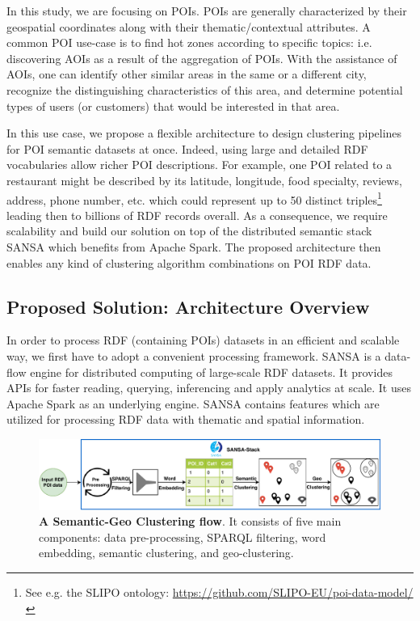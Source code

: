 In this study, we are focusing on \gls{POI}s.
\gls{POI}s are generally characterized by their geospatial coordinates along with their thematic/contextual attributes.
A common \gls{POI} use-case is to find hot zones according to specific topics: i.e. discovering \gls{AOI}s as a result of the aggregation of \gls{POI}s.
With the assistance of \gls{AOI}s, one can identify other similar areas in the same or a different city, recognize the distinguishing characteristics of this area, and determine potential types of users (or customers) that would be interested in that area.

In this use case, we propose a flexible architecture to design clustering pipelines for \gls{POI} semantic datasets at once.
Indeed, using large and detailed \gls{RDF} vocabularies allow richer \gls{POI} descriptions.
For example, one \gls{POI} related to a restaurant might be described by its latitude, longitude, food specialty, reviews, address, phone number, etc. which could represent up to 50 distinct triples\footnote{\scriptsize See e.g. the SLIPO ontology: \url{https://github.com/SLIPO-EU/poi-data-model/}} leading then to billions of RDF records overall.
As a consequence, we require scalability and build our solution on top of the distributed semantic stack SANSA which benefits from Apache Spark.
The proposed architecture then enables any kind of clustering algorithm combinations on \gls{POI} \gls{RDF} data.

\subsection{Proposed Solution: Architecture Overview}
In order to process RDF (containing POIs) datasets in an efficient and scalable way, we first have to adopt a convenient processing framework.
SANSA is a data-flow engine for distributed computing of large-scale \gls{RDF} datasets. 
It provides \gls{API}s for faster reading, querying, inferencing and apply analytics at scale.
It uses Apache Spark as an underlying engine.
SANSA contains features which are utilized for processing \gls{RDF} data with thematic and spatial information.

\begin{figure}
    \centering
	\includegraphics[width=\textwidth]{images/7_implemenation_and_usecases/KmeansPaper8.pdf}
	\caption{\textbf{A Semantic-Geo Clustering flow}.
	It consists of five main components: data pre-processing, SPARQL filtering, word embedding, semantic clustering, and geo-clustering.}
	\label{fig:imp-use-case-clustering}
\end{figure}

